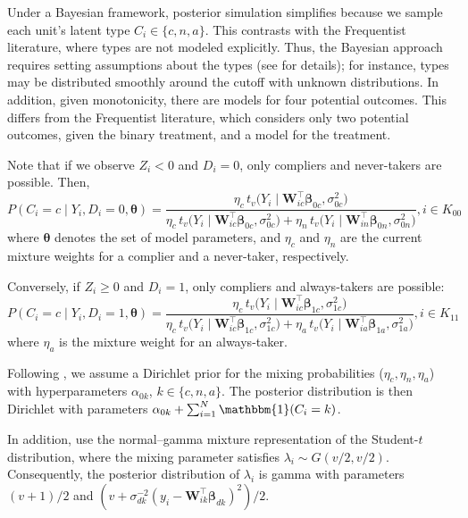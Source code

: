Under a Bayesian framework, posterior simulation simplifies because we sample each unit’s latent type $C_i \in \{c, n, a\}$. This contrasts with the Frequentist literature, where types are not modeled explicitly. Thus, the Bayesian approach requires setting assumptions about the types (see \cite{chib2016bayesian} for details); for instance, types may be distributed smoothly around the cutoff with unknown distributions. In addition, given monotonicity, there are models for four potential outcomes. This differs from the Frequentist literature, which considers only two potential outcomes, given the binary treatment, and a model for the treatment.

Note that if we observe $Z_i < 0$ and $D_i = 0$, only compliers and never-takers are possible. Then,
\[
P(C_i = c \mid Y_i, D_i = 0, \boldsymbol{\theta})
= \frac{\eta_{c} \, t_v\!\big(Y_i \mid \mathbf{W}_{ic}^{\top} \boldsymbol{\beta}_{0c}, \sigma^2_{0c} \big)}
{\eta_{c} \, t_v\!\big(Y_i \mid \mathbf{W}_{ic}^{\top} \boldsymbol{\beta}_{0c}, \sigma^2_{0c} \big) +
	\eta_{n} \, t_v\!\big(Y_i \mid \mathbf{W}_{in}^{\top} \boldsymbol{\beta}_{0n}, \sigma^2_{0n} \big)}, i \in K_{00}
\]
where $\boldsymbol{\theta}$ denotes the set of model parameters, and $\eta_{c}$ and $\eta_{n}$ are the current mixture weights for a complier and a never-taker, respectively.

Conversely, if $Z_i \geq 0$ and $D_i = 1$, only compliers and always-takers are possible:
\[
P(C_i = c \mid Y_i, D_i = 1, \boldsymbol{\theta})
= \frac{\eta_{c} \, t_v\!\big(Y_i \mid \mathbf{W}_{ic}^{\top} \boldsymbol{\beta}_{1c}, \sigma^2_{1c} \big)}
{\eta_{c} \, t_v\!\big(Y_i \mid \mathbf{W}_{ic}^{\top} \boldsymbol{\beta}_{1c}, \sigma^2_{1c} \big) +
	\eta_{a} \, t_v\!\big(Y_i \mid \mathbf{W}_{ia}^{\top} \boldsymbol{\beta}_{1a}, \sigma^2_{1a} \big)}, i \in K_{11}
\]
where $\eta_{a}$ is the mixture weight for an always-taker.

Following \cite{chib2016bayesian}, we assume a Dirichlet prior for the mixing probabilities ($\eta_c, \eta_n,\eta_a$) with hyperparameters $\alpha_{0k}$, $k \in \{c, n, a\}$. The posterior distribution is then Dirichlet with parameters $\alpha_{0k} + \sum_{i=1}^N \mathbbm{1}(C_i = k)$.

In addition, \cite{chib2016bayesian} use the normal--gamma mixture representation of the Student-$t$ distribution, where the mixing parameter satisfies $\lambda_i \sim G(v/2, v/2)$. Consequently, the posterior distribution of $\lambda_i$ is gamma with parameters $(v+1)/2$ and $(v + \sigma_{dk}^{-2}(y_i - \mathbf{W}_{ik}^{\top} \boldsymbol{\beta}_{dk})^2) / 2$.

